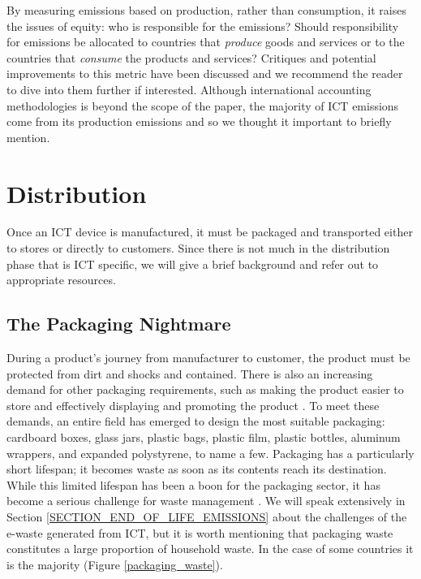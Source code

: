 \documentclass{article}
\begin{document}
By measuring emissions based on production, rather than consumption, it raises the issues of equity: who is responsible for the emissions? Should responsibility for
emissions be allocated to countries that \textit{produce} goods and services or to the countries that \textit{consume} the products and services? Critiques and potential improvements to this metric have been discussed \cite{tukker2020consumption, wang2007owns} and we recommend the reader to dive into them further if interested. Although international accounting methodologies is beyond the scope of the paper, the majority of ICT emissions come from its production emissions \cite{hertwich2011greenhouse} and so we thought it important to briefly mention.


\cleardoublepage
\section{Distribution}
Once an ICT device is manufactured, it must be packaged and transported either to stores or directly to customers. Since there is not much in the distribution phase that is ICT specific, we will give a brief background and refer out to appropriate resources.

\subsection{The Packaging Nightmare}
During a product's journey from manufacturer to customer, the product must be protected from dirt and shocks and contained. There is also an increasing demand for other packaging requirements, such as making the product easier to store and effectively displaying and promoting the product \cite{rundh2005multi}. To meet these demands, an entire field has emerged to design the most suitable packaging: cardboard boxes, glass jars, plastic bags, plastic film, plastic bottles, aluminum wrappers, and expanded polystyrene, to name a few. Packaging has a particularly short lifespan; it becomes waste as soon as its contents reach its destination. 
While this limited lifespan has been a boon for the packaging sector, it has become a serious challenge for waste management \cite{bournay2006vital}. We will speak extensively in Section \ref{SECTION_END_OF_LIFE_EMISSIONS} about the challenges of the e-waste generated from ICT, but it is worth mentioning that packaging waste constitutes a large proportion of household waste. In the case of some countries it is the majority (Figure \ref{packaging_waste}). 
\end{document}

